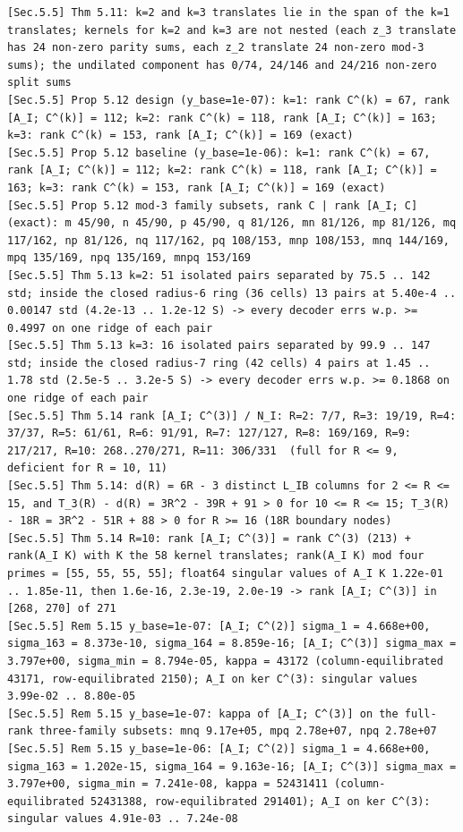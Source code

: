 \documentclass[11pt,a4paper]{article}
\theoremstyle{definition}
\theoremstyle{remark}
\begin{document}
\begin{lstlisting}[style=consolestyle]
[Sec.5.5] Thm 5.11: k=2 and k=3 translates lie in the span of the k=1 translates; kernels for k=2 and k=3 are not nested (each z_3 translate has 24 non-zero parity sums, each z_2 translate 24 non-zero mod-3 sums); the undilated component has 0/74, 24/146 and 24/216 non-zero split sums
[Sec.5.5] Prop 5.12 design (y_base=1e-07): k=1: rank C^(k) = 67, rank [A_I; C^(k)] = 112; k=2: rank C^(k) = 118, rank [A_I; C^(k)] = 163; k=3: rank C^(k) = 153, rank [A_I; C^(k)] = 169 (exact)
[Sec.5.5] Prop 5.12 baseline (y_base=1e-06): k=1: rank C^(k) = 67, rank [A_I; C^(k)] = 112; k=2: rank C^(k) = 118, rank [A_I; C^(k)] = 163; k=3: rank C^(k) = 153, rank [A_I; C^(k)] = 169 (exact)
[Sec.5.5] Prop 5.12 mod-3 family subsets, rank C | rank [A_I; C] (exact): m 45/90, n 45/90, p 45/90, q 81/126, mn 81/126, mp 81/126, mq 117/162, np 81/126, nq 117/162, pq 108/153, mnp 108/153, mnq 144/169, mpq 135/169, npq 135/169, mnpq 153/169
[Sec.5.5] Thm 5.13 k=2: 51 isolated pairs separated by 75.5 .. 142 std; inside the closed radius-6 ring (36 cells) 13 pairs at 5.40e-4 .. 0.00147 std (4.2e-13 .. 1.2e-12 S) -> every decoder errs w.p. >= 0.4997 on one ridge of each pair
[Sec.5.5] Thm 5.13 k=3: 16 isolated pairs separated by 99.9 .. 147 std; inside the closed radius-7 ring (42 cells) 4 pairs at 1.45 .. 1.78 std (2.5e-5 .. 3.2e-5 S) -> every decoder errs w.p. >= 0.1868 on one ridge of each pair
[Sec.5.5] Thm 5.14 rank [A_I; C^(3)] / N_I: R=2: 7/7, R=3: 19/19, R=4: 37/37, R=5: 61/61, R=6: 91/91, R=7: 127/127, R=8: 169/169, R=9: 217/217, R=10: 268..270/271, R=11: 306/331  (full for R <= 9, deficient for R = 10, 11)
[Sec.5.5] Thm 5.14: d(R) = 6R - 3 distinct L_IB columns for 2 <= R <= 15, and T_3(R) - d(R) = 3R^2 - 39R + 91 > 0 for 10 <= R <= 15; T_3(R) - 18R = 3R^2 - 51R + 88 > 0 for R >= 16 (18R boundary nodes)
[Sec.5.5] Thm 5.14 R=10: rank [A_I; C^(3)] = rank C^(3) (213) + rank(A_I K) with K the 58 kernel translates; rank(A_I K) mod four primes = [55, 55, 55, 55]; float64 singular values of A_I K 1.22e-01 .. 1.85e-11, then 1.6e-16, 2.3e-19, 2.0e-19 -> rank [A_I; C^(3)] in [268, 270] of 271
[Sec.5.5] Rem 5.15 y_base=1e-07: [A_I; C^(2)] sigma_1 = 4.668e+00, sigma_163 = 8.373e-10, sigma_164 = 8.859e-16; [A_I; C^(3)] sigma_max = 3.797e+00, sigma_min = 8.794e-05, kappa = 43172 (column-equilibrated 43171, row-equilibrated 2150); A_I on ker C^(3): singular values 3.99e-02 .. 8.80e-05
[Sec.5.5] Rem 5.15 y_base=1e-07: kappa of [A_I; C^(3)] on the full-rank three-family subsets: mnq 9.17e+05, mpq 2.78e+07, npq 2.78e+07
[Sec.5.5] Rem 5.15 y_base=1e-06: [A_I; C^(2)] sigma_1 = 4.668e+00, sigma_163 = 1.202e-15, sigma_164 = 9.163e-16; [A_I; C^(3)] sigma_max = 3.797e+00, sigma_min = 7.241e-08, kappa = 52431411 (column-equilibrated 52431388, row-equilibrated 291401); A_I on ker C^(3): singular values 4.91e-03 .. 7.24e-08

\end{lstlisting}
\end{document}
